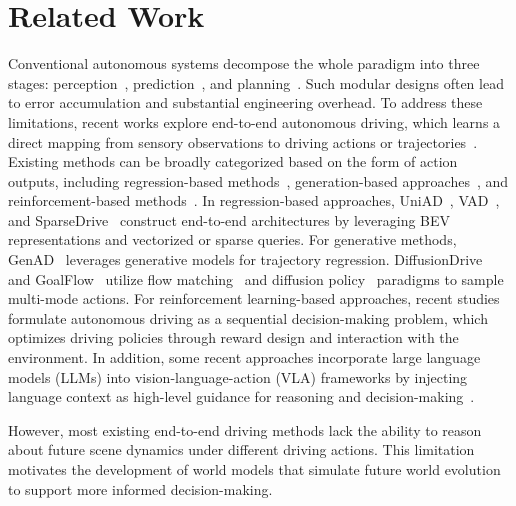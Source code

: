 \section{Related Work}
Conventional autonomous systems decompose the whole paradigm into three stages:  perception~\cite{li2024bevformer,wang2024not,wang2023exploring,liu2024mgmap,liu2025uncertainty}, prediction~\cite{song2020pip,xin2018intention,liu2021survey}, and planning~\cite{lim2019hybrid,gonzalez2015review}. Such modular designs often lead to error accumulation and substantial engineering overhead. 
To address these limitations, recent works explore end-to-end autonomous driving, which learns a direct mapping from sensory observations to driving actions or trajectories~\cite{hu2023planning,sun2025sparsedrive,li2024ego,jiang2023vad}. Existing methods can be broadly categorized 
based on the form of action outputs, including regression-based methods~\cite{hu2022st, jiang2023vad}, generation-based approaches~\cite{zheng2024genad,liao2025diffusiondrive}, and reinforcement-based methods~\cite{gao2025rad,yan2025adr1}. In regression-based approaches, UniAD~\cite{hu2023planning}, VAD~\cite{jiang2023vad}, and SparseDrive~\cite{sun2025sparsedrive} construct end-to-end architectures by leveraging BEV representations and vectorized or sparse queries. For generative methods, GenAD~\cite{zheng2024genad} leverages generative models for trajectory regression. DiffusionDrive~\cite{liao2025diffusiondrive} and GoalFlow~\cite{xing2025goalflow} utilize flow matching~\cite{lipman2022flow} and diffusion policy~\cite{chi2025diffusion} paradigms to sample multi-mode actions. For reinforcement learning-based approaches, recent studies~\cite{li2025driver1,jiao2025evadrive, li2025recogdrive} formulate autonomous driving as a sequential decision-making problem, which optimizes driving policies through reward design and interaction with the environment. In addition, some recent approaches incorporate large language models (LLMs) into vision-language-action (VLA) frameworks by injecting language context as high-level guidance for reasoning and decision-making~\cite{li2025recogdrive,chi2025impromptu,zhou2025opendrivevla}. 

However, most existing end-to-end driving methods lack the ability to reason about future scene dynamics under different driving actions. 
This limitation motivates the development of world models that simulate future world evolution to support more informed decision-making.

